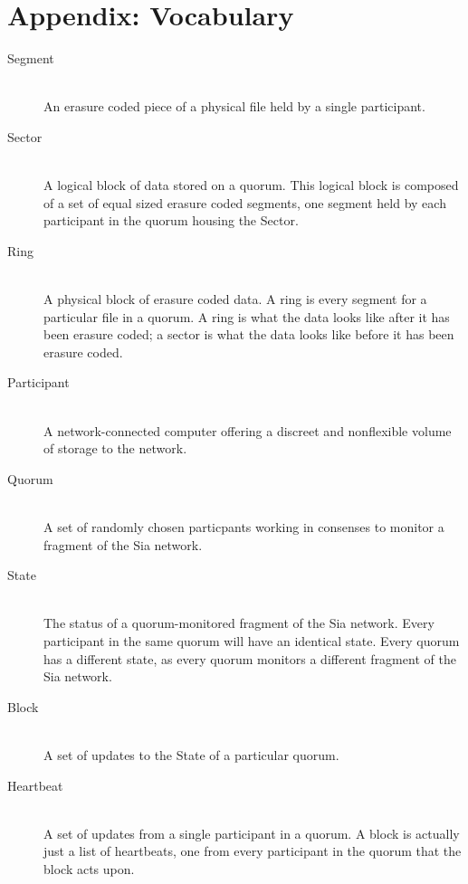 \documentclass[twocolumn]{article}
\begin{document}
\section{Appendix: Vocabulary}

\begin{description}
	\item[Segment] \hfill \\
	An erasure coded piece of a physical file held by a single participant.
	\item[Sector] \hfill \\
	A logical block of data stored on a quorum.
	This logical block is composed of a set of equal sized erasure coded segments, one segment held by each participant in the quorum housing the Sector.
	\item[Ring] \hfill \\
	A physical block of erasure coded data.
	A ring is every segment for a particular file in a quorum.
	A ring is what the data looks like after it has been erasure coded; a sector is what the data looks like before it has been erasure coded.
	
	\item[Participant] \hfill \\
	A network-connected computer offering a discreet and nonflexible volume of storage to the network.
	\item[Quorum] \hfill \\
	A set of randomly chosen particpants working in consenses to monitor a fragment of the Sia network.
	\item[State] \hfill \\
	The status of a quorum-monitored fragment of the Sia network.
	Every participant in the same quorum will have an identical state.
	Every quorum has a different state, as every quorum monitors a different fragment of the Sia network.

	\item[Block] \hfill \\
	A set of updates to the State of a particular quorum.
	\item[Heartbeat] \hfill \\
	A set of updates from a single participant in a quorum.
	A block is actually just a list of heartbeats, one from every participant in the quorum that the block acts upon.
\end{description}
\end{document}
